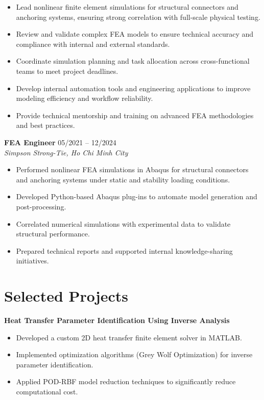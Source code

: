 \documentclass[a4paper,10pt]{article}
\begin{document}
\begin{itemize}[leftmargin=*]
    \item Lead nonlinear finite element simulations for structural connectors and anchoring systems, ensuring strong correlation with full-scale physical testing.
    \item Review and validate complex FEA models to ensure technical accuracy and compliance with internal and external standards.
    \item Coordinate simulation planning and task allocation across cross-functional teams to meet project deadlines.
    \item Develop internal automation tools and engineering applications to improve modeling efficiency and workflow reliability.
    \item Provide technical mentorship and training on advanced FEA methodologies and best practices.
\end{itemize}

\vspace{0.2cm}

\textbf{FEA Engineer} \hfill 05/2021 -- 12/2024 \\
\textit{Simpson Strong-Tie, Ho Chi Minh City}

\begin{itemize}[leftmargin=*]
    \item Performed nonlinear FEA simulations in Abaqus for structural connectors and anchoring systems under static and stability loading conditions.
    \item Developed Python-based Abaqus plug-ins to automate model generation and post-processing.
    \item Correlated numerical simulations with experimental data to validate structural performance.
    \item Prepared technical reports and supported internal knowledge-sharing initiatives.
\end{itemize}

\section*{Selected Projects}

\textbf{Heat Transfer Parameter Identification Using Inverse Analysis}

\begin{itemize}[leftmargin=*]
    \item Developed a custom 2D heat transfer finite element solver in MATLAB.
    \item Implemented optimization algorithms (Grey Wolf Optimization) for inverse parameter identification.
    \item Applied POD-RBF model reduction techniques to significantly reduce computational cost.
\end{itemize}
\end{document}
